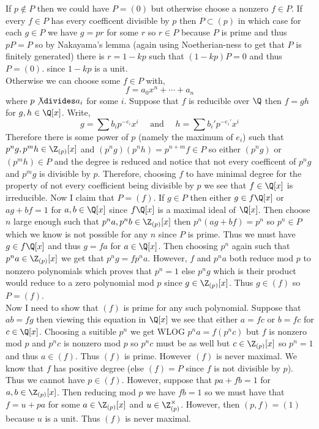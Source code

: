 \documentclass[12pt]{article}
\begin{document}
If $p \notin P$ then we could have $P = (0)$ but otherwise choose a nonzero $f \in P$. If every $f \in P$ has every coefficent divisible by $p$ then $P \subset (p)$ in which case for each $g \in P$ we have $g = pr$ for some $r$ so $r \in P$ because $P$ is prime and thus $p P = P$ so by Nakayama's lemma (again using Noetherian-ness to get that $P$ is finitely generated) there is $r = 1 - kp$ such that $(1 - kp) P = 0$ and thus $P = (0)$. since $1 - kp$ is a unit.
\bigskip\\
Otherwise we can choose some $f \in P$ with,
\[ f = a_0 x^n + \cdots + a_n \]
where $p \not\divides a_i$ for some $i$. Suppose that $f$ is reducible over $\Q$ then $f = gh$ for $g,h \in \Q[x]$. Write,
\[ g = \sum b_i p^{-e_i} x^i \quad \text{ and } \quad h = \sum b_i' p^{-e_i'} x^i \]
Therefore there is some power of $p$ (namely the maximum of $e_i$) such that $p^n g, p^m h \in \Z_{(p)}[x]$ and $(p^n g)(p^n h) = p^{n+m} f \in P$ so either $(p^n g)$ or $(p^m h) \in P$ and the degree is reduced and notice that not every coefficent of $p^n g$ and $p^m g$ is divisible by $p$. Therefore, choosing $f$ to have minimal degree for the property of not every coefficient being divisible by $p$ we see that $f \in \Q[x]$ is irreducible. Now I claim that $P = (f)$. If $g \in P$ then either $g \in f \Q[x]$ or $a g + b f = 1$ for $a, b \in \Q[x]$ since $f \Q[x]$ is a maximal ideal of $\Q[x]$. Then choose $n$ large enough such that $p^n a, p^n b \in \Z_{(p)}[x]$ then $p^n(a g + b f) = p^n$ so $p^n \in P$ which we know is not possible for any $n$ since $P$ is prime. Thus we must have $g \in f \Q[x]$ and thus $g = f a$ for $a \in \Q[x]$. Then choosing $p^n$ again such that $p^n a \in \Z_{(p)}[x]$ we get that $p^n g = f p^n a$. However, $f$ and $p^n a$ both reduce mod $p$ to nonzero polynomials which proves that $p^n = 1$ else $p^n g$ which is their product would reduce to a zero polynomial mod $p$ since $g \in \Z_{(p)}[x]$. Thus $g \in (f)$ so $P = (f)$.
\bigskip\\
Now I need to show that $(f)$ is prime for any such polynomial. Suppose that $ab = fg$ then viewing this equation in $\Q[x]$ we see that either $a = f c$ or $b = f c$ for $c \in \Q[x]$. Choosing a suitible $p^n$ we get WLOG $p^n a = f (p^n c)$ but $f$ is nonzero mod $p$ and $p^n c$ is nonzero mod $p$ so $p^n c$ must be as well but $c \in \Z_{(p)}[x]$ so $p^n = 1$ and thus $a \in (f)$. Thus $(f)$ is prime. However $(f)$ is never maximal. We know that $f$ has positive degree (else $(f) = P$ since $f$ is not divisible by $p$). Thus we cannot have $p \in (f)$. However, suppose that $p a + f b = 1$ for $a,b \in \Z_{(p)}[x]$. Then reducing mod $p$ we have $f b = 1$ so we must have that $f = u + p a$ for some $a \in \Z_{(p)}[x]$ and $u \in \Z_{(p)}^\times$. However, then $(p, f) = (1)$ because $u$ is a unit. Thus $(f)$ is never maximal.
\end{document}

